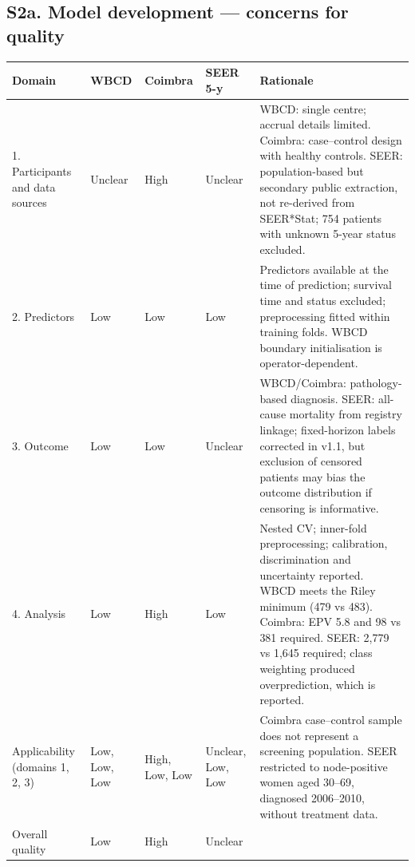 \documentclass[10pt,a4paper]{article}
\begin{document}
\subsection*{S2a. Model development --- concerns for quality}
{\small
\begin{tabularx}{\textwidth}{@{}P{3.0cm}P{1.3cm}P{1.3cm}P{1.4cm}Y@{}}
\toprule
\textbf{Domain} & \textbf{WBCD} & \textbf{Coimbra} & \textbf{SEER 5-y} & \textbf{Rationale}\\
. Participants and data sources & Unclear & High & Unclear & WBCD: single centre; accrual details limited. Coimbra: case--control design with healthy controls. SEER: population-based but secondary public extraction, not re-derived from SEER*Stat; 754 patients with unknown 5-year status excluded.\\
2. Predictors & Low & Low & Low & Predictors available at the time of prediction; survival time and status excluded; preprocessing fitted within training folds. WBCD boundary initialisation is operator-dependent.\\
3. Outcome & Low & Low & Unclear & WBCD/Coimbra: pathology-based diagnosis. SEER: all-cause mortality from registry linkage; fixed-horizon labels corrected in v1.1, but exclusion of censored patients may bias the outcome distribution if censoring is informative.\\
4. Analysis & Low & High & Low & Nested CV; inner-fold preprocessing; calibration, discrimination and uncertainty reported. WBCD meets the Riley minimum (479 vs 483). Coimbra: EPV 5.8 and 98 vs 381 required. SEER: 2,779 vs 1,645 required; class weighting produced overprediction, which is reported.\\
Applicability (domains 1, 2, 3) & Low, Low, Low & High, Low, Low & Unclear, Low, Low & Coimbra case--control sample does not represent a screening population. SEER restricted to node-positive women aged 30--69, diagnosed 2006--2010, without treatment data.\\
\midrule
Overall quality & Low & High & Unclear & \\
\bottomrule
\end{tabularx}
}
\end{document}
